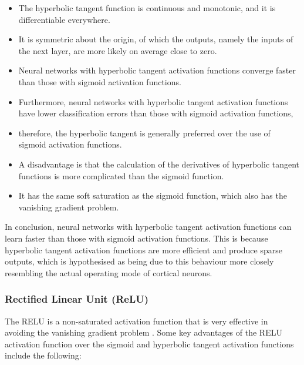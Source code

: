 \begin{itemize}
    \item The hyperbolic tangent function is continuous and monotonic, and it is differentiable everywhere.
    \item It is symmetric about the origin, of which the outputs, namely the inputs of the next layer, are more likely on average close to zero.
    \item Neural networks with hyperbolic tangent activation functions converge faster than those with sigmoid activation functions.
    \item Furthermore, neural networks with hyperbolic tangent activation functions have lower classification errors than those with sigmoid activation functions,
    \item therefore, the hyperbolic tangent is generally preferred over the use of sigmoid activation functions.
    \item A disadvantage is that the calculation of the derivatives of hyperbolic tangent functions is more complicated than the sigmoid function. 
    \item It has the same soft saturation as the sigmoid function, which also has the vanishing gradient problem.
\end{itemize}

In conclusion, neural networks with hyperbolic tangent activation functions can learn faster than those with sigmoid activation functions. This is because hyperbolic tangent activation functions are more efficient and produce sparse outputs, which is hypothesised as being due to this behaviour more closely resembling the actual operating mode of cortical neurons.

\subsubsection{Rectified Linear Unit (ReLU)}\label{ssec:rectified_linear_unit}

The \gls{RELU} is a non-saturated activation function that is very effective in avoiding the vanishing gradient problem \cite{Hara2015}. Some key advantages of the \gls{RELU} activation function over the sigmoid and hyperbolic tangent activation functions include the following:

